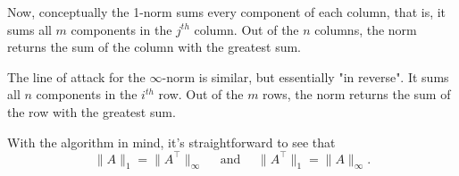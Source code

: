 \documentclass{article}
\begin{document}
\vspace{5mm}

\noindent Now, conceptually the 1-norm sums every component of each column, that is, it sums all $m$ components in the $j^{th}$ column. Out of the $n$ columns, the norm returns the sum of the column with the greatest sum.

\vspace{5mm}

\noindent The line of attack for the $\infty$-norm is similar, but essentially "in reverse". It sums all $n$ components in the $i^{th}$ row. Out of the $m$ rows, the norm returns the sum of the row with the greatest sum.

\vspace{5mm}

\noindent With the algorithm in mind, it's straightforward to see that 
\begin{equation*}
    \| A \|_1 = \| A^\top \|_{\infty} \quad \text { and }\quad 
    \| A^\top \|_1 = \| A \|_{\infty}.
\end{equation*}

\end{document}
